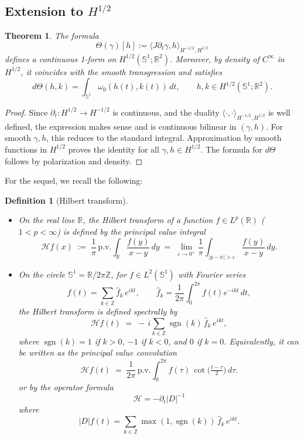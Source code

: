 \documentclass{amsart}
\newcounter{thm}
\newcounter{ex}
\newcounter{re}
\newtheorem{theorem}[thm]{Theorem}
\newtheorem{definition}[thm]{Definition}
\begin{document}
\subsection{Extension to $H^{1/2}$}

\begin{theorem}
\label{th:Hhalf}
The formula
\[
\Theta(\gamma)[h] := \langle J\partial_t\gamma, h\rangle_{H^{-1/2},H^{1/2}}
\]
defines a continuous 1-form on $H^{1/2}(\mathbb S^1;\mathbb R^2)$.
Moreover, by density of $C^\infty$ in $H^{1/2}$, it coincides with the smooth
transgression and satisfies
\[
d\Theta(h,k)=\int_{\mathbb S^1}\omega_0(h(t),k(t))\,dt,\qquad
h,k\in H^{1/2}(\mathbb S^1;\mathbb R^2).
\]
\end{theorem}

\begin{proof}
Since $\partial_t:H^{1/2}\to H^{-1/2}$ is continuous, and
the duality $\langle \cdot,\cdot\rangle_{H^{-1/2},H^{1/2}}$ is well defined,
the expression makes sense and is continuous bilinear in $(\gamma,h)$.
For smooth $\gamma,h$, this reduces to the standard integral.
Approximation by smooth functions in $H^{1/2}$ proves the identity
for all $\gamma,h\in H^{1/2}$.
The formula for $d\Theta$ follows by polarization and density.
\end{proof}

For the sequel, we recall the following: 
\begin{definition}[Hilbert transform]
\leavevmode
\begin{itemize}
\item On the real line $\mathbb R$, the Hilbert transform of a function 
$f\in L^p(\mathbb R)$ ($1<p<\infty$) is defined by the principal value integral
\[
\mathcal H f(x) \;:=\; \frac{1}{\pi}\,\text{p.v.}\int_{\mathbb R} \frac{f(y)}{x-y}\,dy
\;=\; \lim_{\varepsilon\to 0^+} \frac{1}{\pi}\int_{|y-x|>\varepsilon}\frac{f(y)}{x-y}\,dy.
\]

\item On the circle $\mathbb S^1=\mathbb R/2\pi\mathbb Z$, for $f\in L^2(\mathbb S^1)$
with Fourier series
\[
f(t)=\sum_{k\in\mathbb Z}\widehat f_k\,e^{ikt},\qquad
\widehat f_k=\frac{1}{2\pi}\int_0^{2\pi} f(t)e^{-ikt}\,dt,
\]
the Hilbert transform is defined spectrally by
\[
\mathcal H f(t) \;=\; -\,i\sum_{k\in\mathbb Z} \operatorname{sgn}(k)\,\widehat f_k\,e^{ikt},
\]
where $\operatorname{sgn}(k)=1$ if $k>0$, $-1$ if $k<0$, and $0$ if $k=0$.
Equivalently, it can be written as the principal value convolution
\[
\mathcal H f(t) \;=\; \frac{1}{2\pi}\,\text{p.v.}\int_0^{2\pi}
f(\tau)\,\cot\!\Big(\tfrac{t-\tau}{2}\Big)\,d\tau.
\] or by the operator formula $$\mathcal{H} = -\partial_t |D|^{-1}$$
where $$|D| f(t) = \sum_{k\in\mathbb Z} \max \left( 1, \operatorname{sgn}(k)\right) \,\widehat f_k\,e^{ikt}.$$
\end{itemize}
\end{definition}
\end{document}
